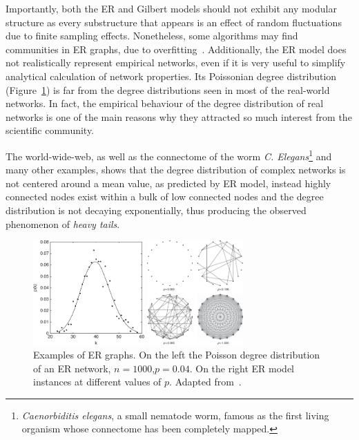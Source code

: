 Importantly, both the ER and Gilbert models should not exhibit any modular structure as every substructure that appears is an effect of random fluctuations due to finite sampling effects. Nonetheless, some algorithms may find communities in ER graphs, due to overfitting~\cite{guimera2004}.
Additionally, the ER model does not realistically represent empirical networks, even if it is very useful to simplify analytical calculation of network properties.
Its Poissonian degree distribution (Figure~\ref{fig:deg_dist_poisson_er}) is far from the degree distributions seen in most of the real-world networks.
In fact, the empirical behaviour of the degree distribution of real networks is one of the main reasons why they attracted so much interest from the scientific community.

The world-wide-web, as well as the connectome of the worm \emph{C.
Elegans}\footnote{\emph{Caenorbiditis elegans}, a small nematode worm, famous as the first living organism whose connectome has been completely mapped.} and many other examples, shows that the degree distribution of complex networks is not centered around a mean value, as predicted by ER model, instead highly connected nodes exist within a bulk of low connected nodes and the degree distribution is not decaying exponentially, thus producing the observed phenomenon of \emph{heavy tails}.
\begin{figure}
\centering
\begin{minipage}[b]{0.5\textwidth}\centering
\includegraphics[height=4cm]{images/deg_dist_poisson_er.pdf}
\end{minipage}\noindent
\begin{minipage}[b]{0.5\textwidth}\centering
\includegraphics[height=4cm]{images/er_graphs.pdf}
\end{minipage}
\caption{Examples of ER graphs.
On the left the Poisson degree distribution of an ER network, $n=1000$,$p=0.04$.
On the right ER model instances at different values of $p$.
Adapted from~\cite{estrada2011}.}
\label{fig:deg_dist_poisson_er}
\end{figure}
